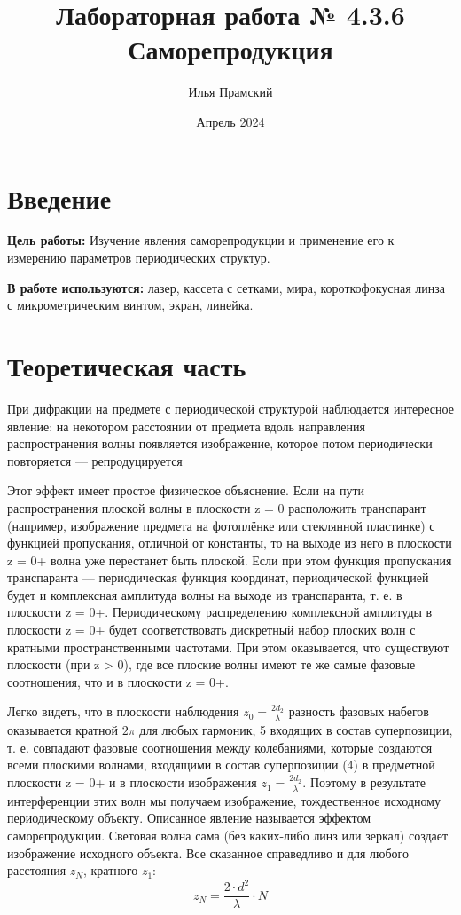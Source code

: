 \documentclass[a4paper,12pt]{article}
\title{Лабораторная работа № 4.3.6\\Саморепродукция}
\author{Илья Прамский}
\date{Апрель 2024}
\begin{document}
\maketitle
\newpage
\section*{Введение}
\textbf{Цель работы:} Изучение явления саморепродукции и применение его к измерению параметров периодических структур.

\textbf{В работе используются:} лазер, кассета с сетками, мира, короткофокусная линза с микрометрическим винтом, экран, линейка.

\section{Теоретическая часть}
При дифракции на предмете с периодической структурой наблюдается интересное явление: на некотором расстоянии от предмета вдоль направления распространения волны появляется изображение, которое потом периодически повторяется — репродуцируется

Этот эффект имеет простое физическое объяснение. Если на
пути распространения плоской волны в плоскости z = 0 расположить транспарант (например, изображение предмета на фотоплёнке или стеклянной пластинке) с функцией пропускания, отличной от константы, то на выходе из него в плоскости z = 0+
волна уже перестанет быть плоской. Если при этом функция пропускания транспаранта — периодическая функция координат, периодической функцией будет и комплексная амплитуда волны на
выходе из транспаранта, т. е. в плоскости z = 0+. Периодическому распределению комплексной амплитуды в плоскости z = 0+
будет соответствовать дискретный набор плоских волн с кратными пространственными частотами. При этом оказывается, что существуют плоскости (при z > 0), где все плоские волны имеют
те же самые фазовые соотношения, что и в плоскости z = 0+.

Легко видеть, что в плоскости наблюдения $z_0 = \frac{2d_2}{\lambda}$ разность фазовых набегов оказывается кратной $2\pi$ для любых гармоник, 5 входящих
в состав суперпозиции, т. е. совпадают фазовые соотношения между
колебаниями, которые создаются всеми плоскими волнами, входящими в состав суперпозиции (4) в предметной плоскости z = 0+ и в плоскости изображения $z_1 = \frac{2d_2}{\lambda}$. Поэтому в результате интерференции этих волн мы получаем изображение, тождественное исходному периодическому объекту. Описанное явление называется эффектом саморепродукции. Световая волна сама (без каких-либо линз или зеркал) создает изображение исходного объекта. Все сказанное справедливо и для любого расстояния $z_N$, кратного $z_1$:
\begin{equation}
z_N = \frac{2 \cdot d^2}{\lambda} \cdot N
\end{equation}
\end{document}
